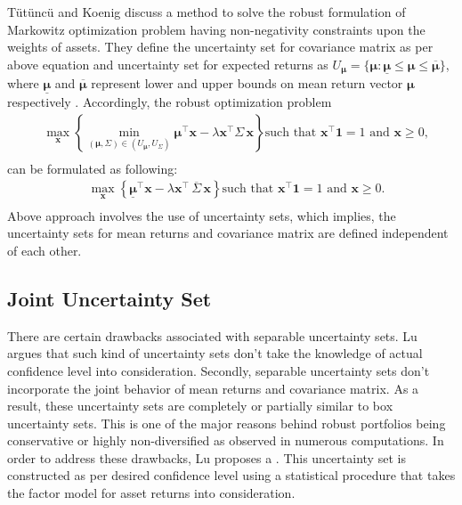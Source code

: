 Tütüncü and Koenig \cite{tutuncu} discuss a method to solve the robust formulation of Markowitz optimization problem having non-negativity constraints upon the weights of assets. They define the uncertainty set for covariance matrix as per above equation and uncertainty set for expected returns as $U_{\boldsymbol{\mu}}= \{\boldsymbol{\mu}: \underline{\boldsymbol{\mu}} \leq \boldsymbol{\mu} \leq \overline{\boldsymbol{\mu}} \}$, where $\underline{\boldsymbol{\mu}}$ and $\overline{\boldsymbol{\mu}}$ represent lower and upper bounds on mean return vector $\boldsymbol{\mu}$ respectively . Accordingly, the robust optimization problem 
\begin{equation}
\begin{split}
& \max_{\mathbf{x}} \left\{ \min_{ (\boldsymbol{\mu},\Sigma) \in (U_{\boldsymbol{\mu}},U_{\Sigma})} \boldsymbol{\mu}^{\top} \mathbf{x} - \lambda \mathbf{x^{\top}}\Sigma \, \mathbf{x} \right\} \text{such that } \mathbf{x^{\top}} \mathbf{1}  = 1 \text{ and } \mathbf{x} \geq 0,  \\
\end{split}
\end{equation}
can be formulated as following:
\begin{equation}
\begin{split}
& \max_{\mathbf{x}} \left\{ \underline{\boldsymbol{\mu}}^{\top} \mathbf{x} - \lambda \mathbf{x^{\top}} \, \overline{\Sigma} \, \mathbf{x} \right\} \text{such that } \mathbf{x^{\top}} \mathbf{1}  = 1 \text{ and } \mathbf{x} \geq 0.  \\
\end{split}
\end{equation}
Above approach involves the use of  uncertainty sets, which implies, the uncertainty sets for mean returns and covariance matrix are defined independent of each other.
\subsection{Joint Uncertainty Set}
  There are certain drawbacks associated with separable uncertainty sets. Lu \cite{lu} argues that such kind of uncertainty sets don't take the knowledge of actual confidence level into consideration. Secondly, separable uncertainty sets don't incorporate the joint behavior of mean returns and covariance matrix. As a result, these uncertainty sets are completely or partially similar to box uncertainty sets. This is one of the major reasons behind robust portfolios being conservative or highly non-diversified as observed in numerous computations. In order to address these drawbacks, Lu proposes a . This uncertainty set is constructed as per desired confidence level using a statistical procedure that takes the factor model \cite{goldfarb2} for asset returns into consideration.

